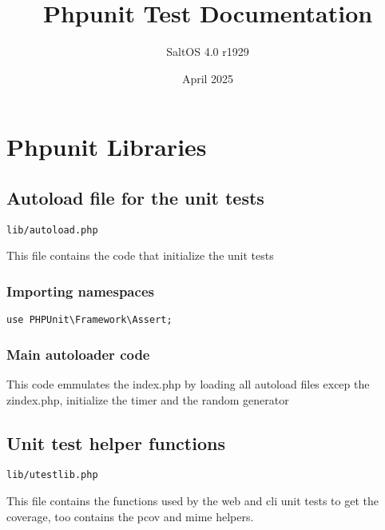\documentclass[a4paper]{article}
\title{Phpunit Test Documentation}
\author{SaltOS 4.0 r1929}
\begin{document}
\date{April 2025}
\maketitle
\clearpage

\tableofcontents
\clearpage


\hypertarget{toc1}{}
\section{Phpunit Libraries}

\hypertarget{toc2}{}
\subsection{Autoload file for the unit tests}

\begin{lstlisting}
lib/autoload.php
\end{lstlisting}

This file contains the code that initialize the unit tests

\hypertarget{toc3}{}
\subsubsection{Importing namespaces}

\begin{lstlisting}
use PHPUnit\Framework\Assert;
\end{lstlisting}

\hypertarget{toc4}{}
\subsubsection{Main autoloader code}

This code emmulates the index.php by loading all autoload files excep
the zindex.php, initialize the timer and the random generator

\hypertarget{toc5}{}
\subsection{Unit test helper functions}

\begin{lstlisting}
lib/utestlib.php
\end{lstlisting}

This file contains the functions used by the web and cli unit tests
to get the coverage, too contains the pcov and mime helpers.

\hypertarget{toc6}{}
\end{document}

